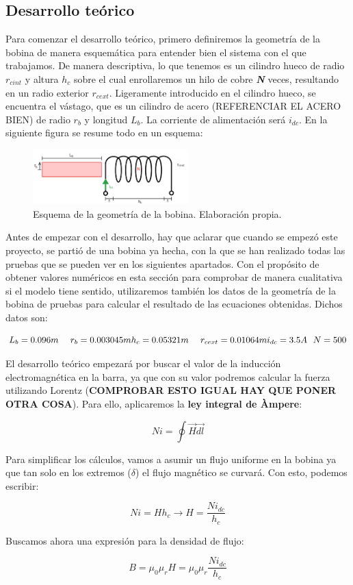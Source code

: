 \subsection{Desarrollo teórico}
\label{subsec:desarrollo}
Para comenzar el desarrollo teórico, primero definiremos la geometría de la bobina de manera esquemática para entender bien el sistema con el que trabajamos. De manera descriptiva, lo que tenemos es un cilindro hueco de radio \( r_{cint} \) y altura \( h_c \) sobre el cual enrollaremos un hilo de cobre \textbf{\textit{N}} veces, resultando en un radio exterior \( r_{cext} \). Ligeramente introducido en el cilindro hueco, se encuentra el vástago, que es un cilindro de acero (REFERENCIAR EL ACERO BIEN) de radio \( r_b \) y longitud \( L_b \). La corriente de alimentación será \( i_{dc} \). En la siguiente figura se resume todo en un esquema:

\begin{figure}[H]
    \centering
    \includegraphics[width=6cm]{FigurasMemoria/fig2esquemaGeom.png}
    \caption{Esquema de la geometría de la bobina. Elaboración propia.}
    \label{fig:3} %
\end{figure}

Antes de empezar con el desarrollo, hay que aclarar que cuando se empezó este proyecto, se partió de una bobina ya hecha, con la que se han realizado todas las pruebas que se pueden ver en los siguientes apartados. Con el propósito de obtener valores numéricos en esta sección para comprobar de manera cualitativa si el modelo tiene sentido, utilizaremos también los datos de la geometría de la bobina de pruebas para calcular el resultado de las ecuaciones obtenidas. Dichos datos son:

\[
L_b=0.096m~~~~r_b=0.003045m
\\~\\
h_c=0.05321m~~~~r_{cext}=0.01064m
\\~\\
i_{dc}=3.5A~~N=500
\]

El desarrollo teórico empezará por buscar el valor de la inducción electromagnética en la barra, ya que con su valor podremos calcular la fuerza utilizando Lorentz (\textbf{COMPROBAR ESTO IGUAL HAY QUE PONER OTRA COSA}). Para ello, aplicaremos la \textbf{ley integral de Àmpere}:

\[
Ni=\oint{\vec{H}\vec{dl}}
\]

Para simplificar los cálculos, vamos a asumir un flujo uniforme en la bobina ya que tan solo en los extremos (\( \delta \)) el flujo magnético se curvará. Con esto, podemos escribir:

\[
Ni=Hh_c\to H=\frac{Ni_{dc}}{h_c}
\]

Buscamos ahora una expresión para la densidad de flujo:

\[
B=\mu_0\mu_r H=\mu_0\mu_r\frac{Ni_{dc}}{h_c}
\]